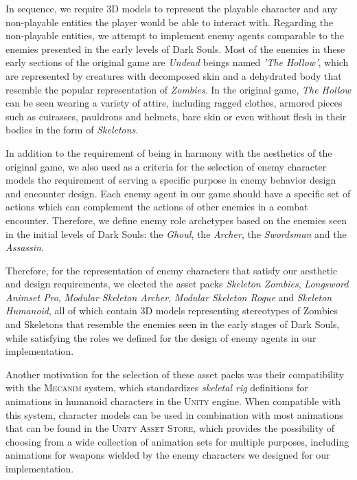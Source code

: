 
In sequence, we require 3D models to represent the playable character and any non-playable entities the player would be able to interact with. Regarding the non-playable entities, we attempt to implement enemy agents comparable to the enemies presented in the early levels of Dark Souls. Most of the enemies in these early sections of the original game are \emph{Undead} beings named \emph{'The Hollow'}, which are represented by creatures with decomposed skin and a dehydrated body that resemble the popular representation of \emph{Zombies}. In the original game, \emph{The Hollow} can be seen wearing a variety of attire, including ragged clothes, armored pieces such as cuirasses, pauldrons and helmets, bare skin or even without flesh in their bodies in the form of \emph{Skeletons}.

In addition to the requirement of being in harmony with the aesthetics of the original game, we also used as a criteria for the selection of enemy character models the requirement of serving a specific purpose in enemy behavior design and encounter design. Each enemy agent in our game should have a specific set of actions which can complement the actions of other enemies in a combat encounter. Therefore, we define enemy role archetypes based on the enemies seen in the initial levels of Dark Souls: the \emph{Ghoul}, the \emph{Archer}, the \emph{Swordsman} and the \emph{Assassin}.

Therefore, for the representation of enemy characters that satisfy our aesthetic and design requirements, we elected the asset packs \emph{Skeleton Zombies}, \emph{Longsword Animset Pro}, \emph{Modular Skeleton Archer}, \emph{Modular Skeleton Rogue} and \emph{Skeleton Humanoid}, all of which contain 3D models representing stereotypes of Zombies and Skeletons that resemble the enemies seen in the early stages of Dark Souls, while satisfying the roles we defined for the design of enemy agents in our implementation.

Another motivation for the selection of these asset packs was their compatibility with the \textsc{Mecanim} system, which standardizes \emph{skeletal rig} definitions for animations in humanoid characters in the \textsc{Unity} engine. When compatible with this system, character models can be used in combination with most animations that can be found in the \textsc{Unity Asset Store}, which provides the possibility of choosing from a wide collection of animation sets for multiple purposes, including animations for weapons wielded by the enemy characters we designed for our implementation.

